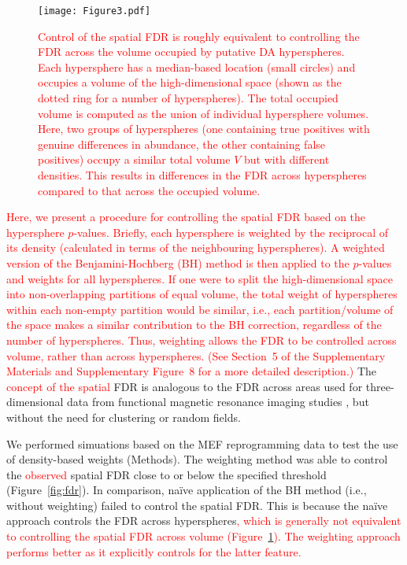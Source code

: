 \documentclass{article}
\newcommand\revised[1]{\textcolor{red}{#1}}
\newcommand{\suppfdr}{5}
\newcommand{\suppfigfdr}{8}
\begin{document}
\begin{figure}[bt]
\begin{center}
\texttt{[image: Figure3.pdf]}
\end{center}
\caption{\revised{Control of the spatial FDR is roughly equivalent to controlling the FDR across the volume occupied by putative DA hyperspheres.
    Each hypersphere has a median-based location (small circles) and occupies a volume of the high-dimensional space (shown as the dotted ring for a number of hyperspheres).
    The total occupied volume is computed as the union of individual hypersphere volumes.
    Here, two groups of hyperspheres (one containing true positives with genuine differences in abundance, the other containing false positives) occupy a similar total volume $V$ but with different densities.
This results in differences in the FDR across hyperspheres compared to that across the occupied volume.
}}
\label{fig:fdrexample}
\end{figure}

\revised{Here, we present a procedure for controlling the spatial FDR based on the hypersphere $p$-values.
    Briefly, each hypersphere is weighted by the reciprocal of its density (calculated in terms of the neighbouring hyperspheres).
    A weighted version of the Benjamini-Hochberg (BH) method \cite{benjamini1997multiple} is then applied to the $p$-values and weights for all hyperspheres.
    If one were to split the high-dimensional space into non-overlapping partitions of equal volume, the total weight of hyperspheres within each non-empty partition would be similar, i.e., each partition/volume of the space makes a similar contribution to the BH correction, regardless of the number of hyperspheres.
    Thus, weighting allows the FDR to be controlled across volume, rather than across hyperspheres.
(See Section~\suppfdr{} of the Supplementary Materials and Supplementary Figure~\suppfigfdr{} for a more detailed description.)}
    The \revised{concept of the spatial} FDR is analogous to the FDR across areas used for three-dimensional data from functional magnetic resonance imaging studies \cite{pacifico2004false,benjamini2007false}, but without the need for clustering or random fields.

We performed simuations based on the MEF reprogramming data to test the use of density-based weights (Methods).
The weighting method was able to control the \revised{observed} spatial FDR close to or below the specified threshold (Figure~\ref{fig:fdr}).
In comparison, na\"ive application of the BH method (i.e., without weighting) failed to control the spatial FDR.
This is because the na\"ive approach controls the FDR across hyperspheres\revised{, which is generally not equivalent to controlling the spatial FDR across volume (Figure~\ref{fig:fdrexample}).
The weighting approach performs better as it explicitly controls for the latter feature.}
\end{document}
